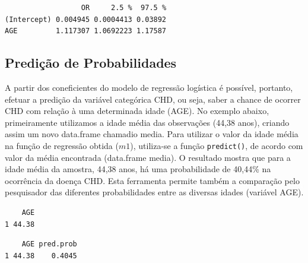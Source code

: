 \documentclass[12pt,brazil,oneside]{book}
\newenvironment{Shaded}{\begin{snugshade}}{\end{snugshade}}
\newcommand{\DataTypeTok}[1]{\textcolor[rgb]{0.13,0.29,0.53}{#1}}
\newcommand{\KeywordTok}[1]{\textcolor[rgb]{0.13,0.29,0.53}{\textbf{#1}}}
\newcommand{\NormalTok}[1]{#1}
\newcommand{\OperatorTok}[1]{\textcolor[rgb]{0.81,0.36,0.00}{\textbf{#1}}}
\newcommand{\StringTok}[1]{\textcolor[rgb]{0.31,0.60,0.02}{#1}}
\begin{document}
\begin{verbatim}
                  OR     2.5 %  97.5 %
(Intercept) 0.004945 0.0004413 0.03892
AGE         1.117307 1.0692223 1.17587
\end{verbatim}

\hypertarget{predicao-de-probabilidades}{%
\subsection{Predição de
Probabilidades}\label{predicao-de-probabilidades}}

A partir dos coneficientes do modelo de regressão logística é possível,
portanto, efetuar a predição da variável categórica CHD, ou seja, saber
a chance de ocorrer CHD com relação à uma determinada idade (AGE). No
exemplo abaixo, primeiramente utilizamos a idade média das observações
(44,38 anos), criando assim um novo data.frame chamadio media. Para
utilizar o valor da idade média na função de regressão obtida (\(m1\)),
utiliza-se a função \texttt{predict()}, de acordo com valor da média
encontrada (data.frame media). O resultado mostra que para a idade média
da amostra, 44,38 anos, há uma probabilidade de 40,44\% na ocorrência da
doença CHD. Esta ferramenta permite também a comparação pelo pesquisador
das diferentes probabilidades entre as diversas idades (variável AGE).

\begin{Shaded}
\end{Shaded}

\begin{verbatim}
    AGE
1 44.38
\end{verbatim}

\begin{Shaded}
\end{Shaded}

\begin{verbatim}
    AGE pred.prob
1 44.38    0.4045
\end{verbatim}
\end{document}
